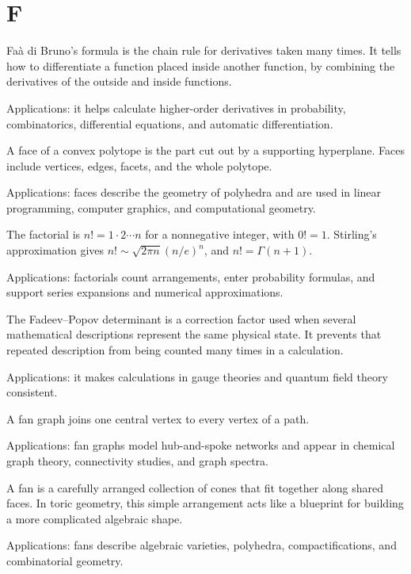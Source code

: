 \chapter*{F}
\label{chap:f}

Faà di Bruno's formula is the chain rule for derivatives taken many times. It tells how to differentiate a function placed inside another function, by combining the derivatives of the outside and inside functions. \par\noindent Applications: it helps calculate higher-order derivatives in probability, combinatorics, differential equations, and automatic differentiation.

A face of a convex polytope is the part cut out by a supporting hyperplane. Faces include vertices, edges, facets, and the whole polytope. \par\noindent Applications: faces describe the geometry of polyhedra and are used in linear programming, computer graphics, and computational geometry.

The factorial is $n!=1\cdot2\cdots n$ for a nonnegative integer, with $0!=1$. Stirling's approximation gives $n!\sim\sqrt{2\pi n}(n/e)^n$, and $n!=\Gamma(n+1)$. \par\noindent Applications: factorials count arrangements, enter probability formulas, and support series expansions and numerical approximations.

The Fadeev--Popov determinant is a correction factor used when several mathematical descriptions represent the same physical state. It prevents that repeated description from being counted many times in a calculation. \par\noindent Applications: it makes calculations in gauge theories and quantum field theory consistent.

A fan graph joins one central vertex to every vertex of a path. \par\noindent Applications: fan graphs model hub-and-spoke networks and appear in chemical graph theory, connectivity studies, and graph spectra.

A fan is a carefully arranged collection of cones that fit together along shared faces. In toric geometry, this simple arrangement acts like a blueprint for building a more complicated algebraic shape. \par\noindent Applications: fans describe algebraic varieties, polyhedra, compactifications, and combinatorial geometry.

